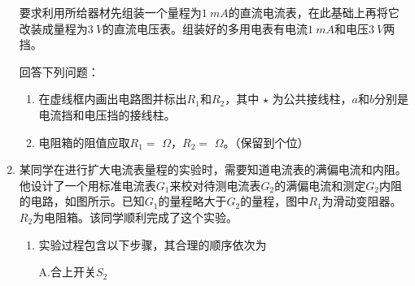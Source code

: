 \begin{enumerate}[leftmargin=0em]
要求利用所给器材先组装一个量程为$ 1\ mA $的直流电流表，在此基础上再将它改装成量程为$ 3\ V $的直流电压表。组装好的多用电表有电流$ 1\ mA $和电压$ 3\ V $两挡。

回答下列问题：

\begin{enumerate}
\renewcommand{\labelenumi}{\arabic{enumi}.}
\item
在虚线框内画出电路图并标出$ R_{1} $和$ R_{2} $，其中 $ \star $ 为公共接线柱，$ a $和$ b $分别是电流挡和电压挡的接线柱。
\begin{figure}[h!]
\centering

\end{figure}

\item 
电阻箱的阻值应取$ R_{1} = $  $ \Omega $，$ R_{2} = $  $ \Omega $。（保留到个位）



\end{enumerate}





\item 
{}
某同学在进行扩大电流表量程的实验时，需要知道电流表的满偏电流和内阻。他设计了一个用标准电流表$ G_{1} $来校对待测电流表$ G_{2} $的满偏电流和测定$ G_{2} $内阻的电路，如图所示。已知$ G_{1} $的量程略大于$ G_{2} $的量程，图中$ R_{1} $为滑动变阻器。$ R_{2} $为电阻箱。该同学顺利完成了这个实验。
\begin{figure}[h!]
\centering

\end{figure}

\begin{enumerate}
\renewcommand{\labelenumi}{\arabic{enumi}.}
\item
实验过程包含以下步骤，其合理的顺序依次为

A.合上开关$ S_{2} $


\end{enumerate}
\end{enumerate}

